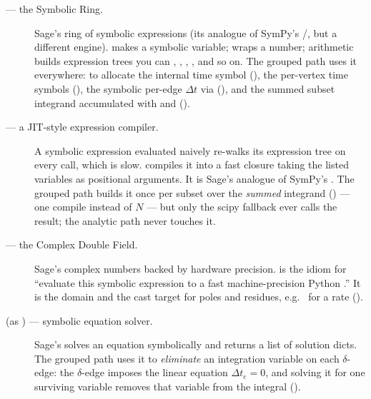 \begin{description}
  \item[ --- the Symbolic Ring.] Sage's ring of symbolic expressions
        (its analogue of SymPy's /, but a different
        engine).  makes a symbolic variable;  wraps
        a number; arithmetic builds expression trees you can ,
        , , , and so on.
        The grouped path uses it everywhere: to allocate the internal time symbol
         (), the
        per-vertex time symbols (), the symbolic
        per-edge $\Delta t$ via 
        (), and the summed subset integrand
        accumulated with \code{+} and \code{*}
        ().
  \item[ --- a JIT-style expression compiler.] A symbolic
         expression evaluated naively re-walks its expression tree on
        every call, which is slow.  compiles it into a fast closure taking the listed variables
        as positional arguments. It is Sage's analogue of SymPy's
        . The grouped path builds it once per subset over the
        \emph{summed} integrand () --- one
        compile instead of $N$ --- but only the scipy fallback ever calls the
        result; the analytic path never touches it.
  \item[ --- the Complex Double Field.] Sage's complex numbers backed
        by hardware  precision.  is the
        idiom for ``evaluate this symbolic expression to a fast machine-precision
        Python .'' It is the  domain and the
        cast target for poles and residues, e.g.\ 
        for a rate ().
  \item[ (as ) --- symbolic equation solver.] Sage's
         solves an equation
        symbolically and returns a list of solution dicts. The grouped path uses
        it to \emph{eliminate} an integration variable on each $\delta$-edge: the
        $\delta$-edge imposes the linear equation $\Delta t_e = 0$, and solving it
        for one surviving variable removes that variable from the integral
        ().
\end{description}

